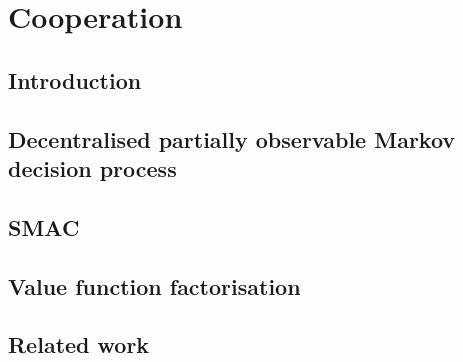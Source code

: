 \chapter{Cooperation}\label{ch:cooperation}
\section{Introduction}
\section{Decentralised partially observable Markov decision process}
\section{SMAC}
\section{Value function factorisation}
\section{Related work}

